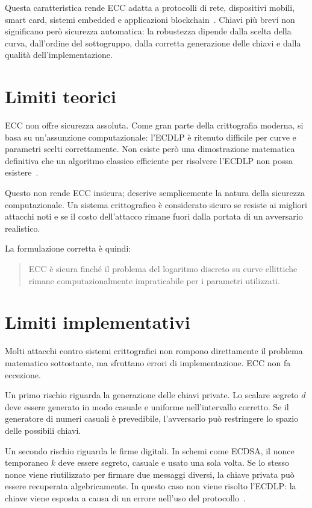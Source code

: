\documentclass[12pt,a4paper,oneside]{report}
\begin{document}
Questa caratteristica rende ECC adatta a protocolli di rete, dispositivi mobili, smart card, sistemi embedded e applicazioni blockchain~\cite{nist_sp800_57,sec1}. Chiavi più brevi non significano però sicurezza automatica: la robustezza dipende dalla scelta della curva, dall'ordine del sottogruppo, dalla corretta generazione delle chiavi e dalla qualità dell'implementazione.

\section{Limiti teorici}

ECC non offre sicurezza assoluta. Come gran parte della crittografia moderna, si basa su un'assunzione computazionale: l'ECDLP è ritenuto difficile per curve e parametri scelti correttamente. Non esiste però una dimostrazione matematica definitiva che un algoritmo classico efficiente per risolvere l'ECDLP non possa esistere~\cite{margara_complessita,sec1}.

Questo non rende ECC insicura; descrive semplicemente la natura della sicurezza computazionale. Un sistema crittografico è considerato sicuro se resiste ai migliori attacchi noti e se il costo dell'attacco rimane fuori dalla portata di un avversario realistico.

La formulazione corretta è quindi:

\begin{quote}
ECC è sicura finché il problema del logaritmo discreto su curve ellittiche rimane computazionalmente impraticabile per i parametri utilizzati.
\end{quote}

\section{Limiti implementativi}

Molti attacchi contro sistemi crittografici non rompono direttamente il problema matematico sottostante, ma sfruttano errori di implementazione. ECC non fa eccezione.

Un primo rischio riguarda la generazione delle chiavi private. Lo scalare segreto \(d\) deve essere generato in modo casuale e uniforme nell'intervallo corretto. Se il generatore di numeri casuali è prevedibile, l'avversario può restringere lo spazio delle possibili chiavi.

Un secondo rischio riguarda le firme digitali. In schemi come ECDSA, il nonce temporaneo \(k\) deve essere segreto, casuale e usato una sola volta. Se lo stesso nonce viene riutilizzato per firmare due messaggi diversi, la chiave privata può essere recuperata algebricamente. In questo caso non viene risolto l'ECDLP: la chiave viene esposta a causa di un errore nell'uso del protocollo~\cite{margara_firma,fips_186_5}.
\end{document}
